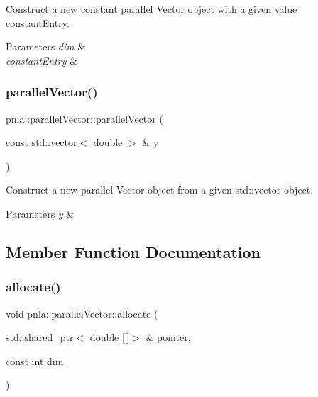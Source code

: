 Construct a new constant parallel Vector object with a given value constant\+Entry. 


\begin{DoxyParams}{Parameters}
{\em dim} & \\
\hline
{\em constant\+Entry} & \\
\hline
\end{DoxyParams}
\mbox{\label{structpnla_1_1parallelVector_ad543dc44e8e582c75be49d16661b73f5}} 
\subsubsection{\texorpdfstring{parallel\+Vector()}{parallelVector()}\hspace{0.1cm}{\footnotesize\ttfamily [3/3]}}
{\footnotesize\ttfamily pnla\+::parallel\+Vector\+::parallel\+Vector (\begin{DoxyParamCaption}\item[{const std\+::vector$<$ double $>$ \&}]{y }\end{DoxyParamCaption})\hspace{0.3cm}{\ttfamily [inline]}}



Construct a new parallel Vector object from a given std\+::vector object. 


\begin{DoxyParams}{Parameters}
{\em y} & \\
\hline
\end{DoxyParams}


\subsection{Member Function Documentation}
\mbox{\label{structpnla_1_1parallelVector_a47a92803332ce110eb8b094adc85989f}} 
\subsubsection{\texorpdfstring{allocate()}{allocate()}}
{\footnotesize\ttfamily void pnla\+::parallel\+Vector\+::allocate (\begin{DoxyParamCaption}\item[{std\+::shared\+\_\+ptr$<$ double \mbox{[}$\,$\mbox{]}$>$ \&}]{pointer,  }\item[{const int}]{dim }\end{DoxyParamCaption})}



